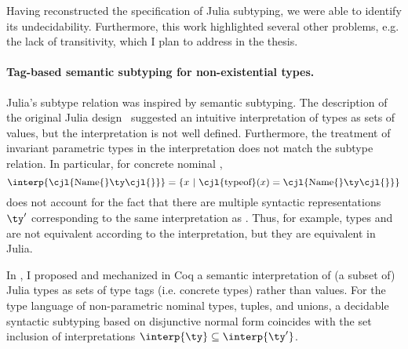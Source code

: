 Having reconstructed the specification of Julia subtyping,
we were able to identify its undecidability. Furthermore, this work highlighted
several other problems, e.g. the lack of transitivity,
which I plan to address in the thesis.

\paragraph{Tag-based semantic subtyping for non-existential types.}
Julia's subtype relation was inspired by semantic subtyping.
The description of the original Julia design~\cite{bib:bezanson:julia:2015}
suggested an intuitive interpretation of types as sets of values,
but the interpretation is not well defined.
Furthermore, the treatment of invariant parametric types
in the interpretation does not match
the subtype relation. In particular, for concrete nominal ,
\[
  \interp{\text{\cjl{Name\{}}\ty\text{\cjl{\}}}} =
  \{ x\ |\ \text{\cjl{typeof}}(x) = \text{\cjl{Name\{}}\ty\text{\cjl{\}}} \}   
\]
does not account for the fact that there are multiple syntactic
representations $\ty'$ corresponding to the same interpretation as \ty.
Thus, for example, types  and 
are not equivalent according to the interpretation,
but they are equivalent in Julia.

In \cite{bib:belyakova:minijl-sub:ftfjp:2019}, I proposed and mechanized in Coq
a semantic interpretation of (a subset of) Julia
types \ty as sets of type tags \gty (i.e. concrete types) rather than values.
For the type language of non-parametric nominal types, tuples, and unions,
a decidable syntactic subtyping based on disjunctive normal form
coincides with the set inclusion of interpretations
$\interp{\ty} \subseteq \interp{\ty'}$.

